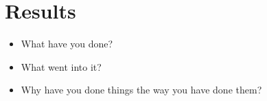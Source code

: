 \section{Results}

\begin{itemize}
    \item What have you done?
    \item What went into it?
    \item Why have you done things the way you have done them?
\end{itemize}
